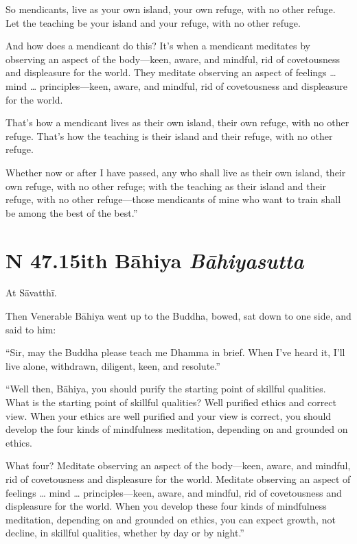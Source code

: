 \documentclass[12pt,openany]{book}%
\newcommand*{\suttatitleacronym}[1]{\smaller[2]{#1}\vspace*{.3em}}
\newcommand*{\suttatitletranslation}[1]{\linebreak{#1}}
\newcommand*{\suttatitleroot}[1]{\linebreak\smaller[2]\itshape{#1}}
\newcommand*{\tocacronym}[1]{\hspace*{-3.3em}{#1}\quad}
\newcommand*{\toctranslation}[1]{#1}
\newcommand*{\tocroot}[1]{(\textit{#1})}
\begin{document}
So mendicants, live as your own island, your own refuge, with no other refuge. Let the teaching be your island and your refuge, with no other refuge. 

And how does a mendicant do this? It’s when a mendicant meditates by observing an aspect of the body—keen, aware, and mindful, rid of covetousness and displeasure for the world. They meditate observing an aspect of feelings … mind … principles—keen, aware, and mindful, rid of covetousness and displeasure for the world. 

That’s how a mendicant lives as their own island, their own refuge, with no other refuge. That’s how the teaching is their island and their refuge, with no other refuge. 

Whether now or after I have passed, any who shall live as their own island, their own refuge, with no other refuge; with the teaching as their island and their refuge, with no other refuge—those mendicants of mine who want to train shall be among the best of the best.” 

%
\section*{{\suttatitleacronym SN 47.15}{\suttatitletranslation With Bāhiya }{\suttatitleroot Bāhiyasutta}}
\addcontentsline{toc}{section}{\tocacronym{SN 47.15} \toctranslation{With Bāhiya } \tocroot{Bāhiyasutta}}

At \textsanskrit{Sāvatthī}. 

Then Venerable \textsanskrit{Bāhiya} went up to the Buddha, bowed, sat down to one side, and said to him: 

“Sir, may the Buddha please teach me Dhamma in brief. When I’ve heard it, I’ll live alone, withdrawn, diligent, keen, and resolute.” 

“Well then, \textsanskrit{Bāhiya}, you should purify the starting point of skillful qualities. What is the starting point of skillful qualities? Well purified ethics and correct view. When your ethics are well purified and your view is correct, you should develop the four kinds of mindfulness meditation, depending on and grounded on ethics. 

What four? Meditate observing an aspect of the body—keen, aware, and mindful, rid of covetousness and displeasure for the world. Meditate observing an aspect of feelings … mind … principles—keen, aware, and mindful, rid of covetousness and displeasure for the world. When you develop these four kinds of mindfulness meditation, depending on and grounded on ethics, you can expect growth, not decline, in skillful qualities, whether by day or by night.” 
\end{document}
